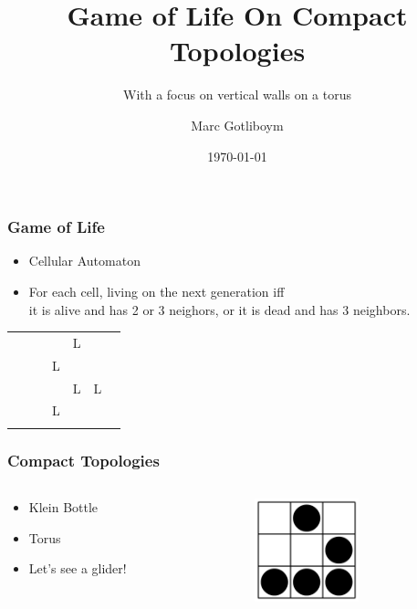 \documentclass[10pt]{beamer}
\title{Game of Life On Compact Topologies}
\subtitle{With a focus on vertical walls on a torus}
\author{Marc Gotliboym}
\date{\today}
\begin{document}
\frame{\titlepage}
\begin{frame}
  \frametitle{Game of Life}
  \begin{itemize}
    \item Cellular Automaton
    \item For each cell, living on the next generation iff \\
    it is alive and has 2 or 3 neighors, or it is dead and has 3 neighbors.
  \end{itemize}
  \begin{tabularx}{\textwidth}{@{\rule[-3ex]{0pt}{7ex}}|*{7}{C|}}
    \hline
     &  &  &  &  &  &  \\
    \hline
     &  &  &  &L  &  &  \\
    \hline
     &  &  &L &  &  &  \\
    \hline
     &  &  &  &L &L  &  \\
    \hline
     &  &  &L  &  &  &  \\
    \hline
     &  &  &  &  &  &  \\
    \hline
  \end{tabularx}
\end{frame}

\begin{frame}
  \frametitle{Compact Topologies}
  \begin{columns}
    \begin{column}{0.5\textwidth}
      \begin{itemize}
        \item Klein Bottle
        \item Torus \\
        \item Let's see a glider!
      \end{itemize}
    \end{column}
    \begin{column}{0.5\textwidth}
      \includegraphics[height=3cm]{glider}
    \end{column}
  \end{columns}
\end{frame}
\end{document}

